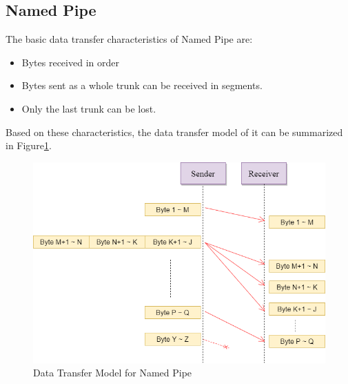 \subsection{Named Pipe}
The basic data transfer characteristics of Named Pipe are:
\begin{itemize}
  \item Bytes received in order
  \item Bytes sent as a whole trunk can be received in segments.
  \item Only the last trunk can be lost.
\end{itemize}
Based on these characteristics, the data transfer model of it can be summarized in Figure\ref{namedpipe}. 
\begin{figure}[H]
\centerline{\includegraphics[scale=0.48]{Figures/namedpipe}}
\caption{Data Transfer Model for Named Pipe}
\label{namedpipe}
\end{figure}

